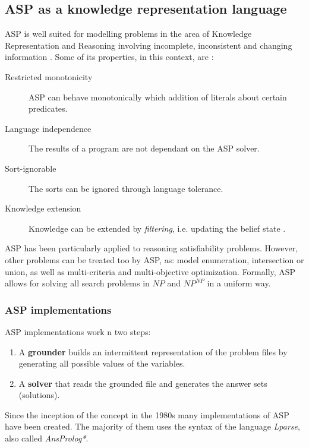 \subsection{ASP as a knowledge representation language}

ASP is well suited for modelling problems in the area of Knowledge Representation and Reasoning involving incomplete, inconsistent and changing information \citep{Schaub13_ASPBoCo}. Some of its properties, in this context, are \citep{Todorova2006_CKASP}:

\begin{description}
\item[Restricted monotonicity] ASP can behave monotonically which addition of literals about certain predicates.
\item[Language independence] The results of a program are not dependant on the ASP solver.
\item[Sort-ignorable] The sorts can be ignored through language tolerance. %
\item[Knowledge extension] Knowledge can be extended by \textit{filtering}, i.e. updating the belief state \citep{Amir2003_LogFil}.
\end{description}

ASP has been particularly applied to reasoning satisfiability problems.
However, other problems can be treated too by ASP, as: model enumeration, intersection or union, as well as multi-criteria and multi-objective optimization. 
Formally, ASP allows for solving all search problems in $NP$ and $NP^{NP}$ in a uniform way. 


\subsubsection{ASP implementations}
ASP implementations work n two steps:

\begin{enumerate}
\item A \textbf{grounder} builds an intermittent representation of the problem files by generating all possible values of the variables.
\item A \textbf{solver} that reads the grounded file and generates the answer sets (solutions).
\end{enumerate}

Since the inception of the concept in the 1980s \citep{Gelf88a} many implementations of ASP have been created.
The majority of them uses the syntax of the language \textit{Lparse}, also called \textit{AnsProlog*}.

